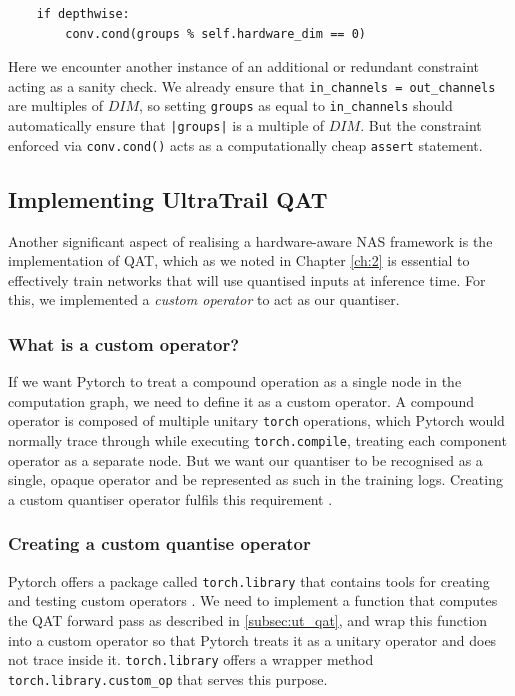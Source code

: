 \documentclass[11pt,a4paper, open=any]{scrbook}
\newcounter{constraint}[chapter]
\newcommand{\py}[1]{\texttt{#1}}
\begin{document}
\begin{verbatim}
	if depthwise:
		conv.cond(groups % self.hardware_dim == 0)	
\end{verbatim} 

Here we encounter another instance of an additional or redundant constraint acting as a sanity check. We already ensure that \texttt{in\_channels = out\_channels} are multiples of $DIM$, so setting \py{groups} as equal to \py{in_channels} should automatically ensure that \texttt{|groups|} is a multiple of $DIM$. But the constraint enforced via \py{conv.cond()} acts as a computationally cheap \py{assert} statement.

\subsection{Implementing UltraTrail QAT}
Another significant aspect of realising a hardware-aware NAS framework is the implementation of QAT, which as we noted in Chapter \ref{ch:2} is essential to effectively train networks that will use quantised inputs at inference time. For this, we implemented a \textit{custom operator} to act as our quantiser. 

\subsubsection{What is a custom operator?}
If we want Pytorch to treat a compound operation as a single node in the computation graph, we need to define it as a custom operator. A compound operator is composed of multiple unitary \py{torch} operations, which Pytorch would normally trace through while executing \py{torch.compile}, treating each component operator as a separate node. But we want our quantiser to be recognised as a single, opaque operator and be represented as such in the training logs. Creating a custom quantiser operator fulfils this requirement \cite{torch_custom}.

\subsubsection{Creating a custom quantise operator} 
Pytorch offers a package called \py{torch.library} that contains tools for creating and testing custom operators \cite{torch_lib}. We need to implement a function that computes the QAT forward pass as described in \ref{subsec:ut_qat}, and wrap this function into a custom operator so that Pytorch treats it as a unitary operator and does not trace inside it. \py{torch.library} offers a wrapper method \py{torch.library.custom_op} that serves this purpose.
\end{document}
